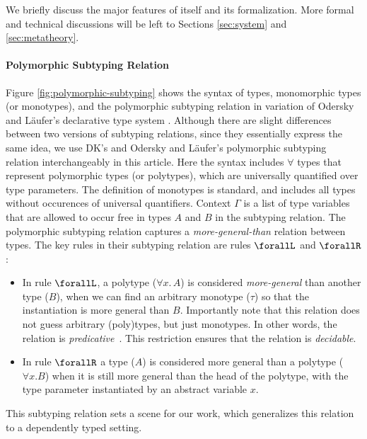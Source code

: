 We briefly discuss the major features of \name itself and
its formalization. More formal and technical discussions will be left to
Sections \ref{sec:system} and \ref{sec:metatheory}.

\paragraph{Polymorphic Subtyping Relation}
Figure \ref{fig:polymorphic-subtyping} shows the syntax of types, monomorphic types (or monotypes),
and the polymorphic subtyping relation in \cite{dunfield2013complete} variation of
Odersky and L\"aufer's declarative type system \citep{odersky1996putting}. Although there
are slight differences between two versions of subtyping relations, since they essentially express
the same idea, we use DK's and Odersky and L\"aufer's polymorphic subtyping relation interchangeably
in this article.
Here the syntax includes $\forall$ types that represent polymorphic types (or polytypes),
which are universally quantified over type parameters. The definition of monotypes
is standard, and includes all types without occurences of universal quantifiers.
Context $\Gamma$ is a list of type variables that are allowed to occur free in types
$A$ and $B$ in the subtyping relation.
The polymorphic subtyping relation captures a \emph{more-general-than} relation
between types. The key rules in their subtyping relation are rules $\forallL$
and $\forallR$:

\begin{itemize}
  \item In rule $\forallL$, a polytype ($\forall x.\, A$) is considered \emph{more-general}
        than another type ($B$), when we can find an arbitrary monotype ($\tau$)
        so that the instantiation is more general than $B$.
        Importantly note that this relation does not guess arbitrary (poly)types,
        but just monotypes. In other words, the relation is \emph{predicative}~\citep{Martin-Lof-1972}.
        This restriction ensures that the relation is \emph{decidable}.

  \item In rule $\forallR$ a type ($A$) is considered more general than a polytype ($\forall x. B$)
        when it is still more general than the head of the polytype, with the type
        parameter instantiated by an abstract variable $x$.
\end{itemize}

This subtyping relation sets a scene for our work, which
generalizes this relation to a dependently typed setting.

